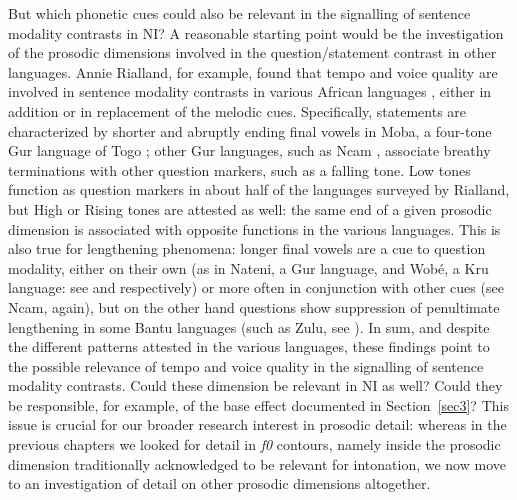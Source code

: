 But which phonetic cues could also be relevant in the signalling of sentence modality contrasts in NI? A reasonable starting point would be the investigation of the prosodic dimensions involved in the question/statement contrast in other languages. Annie Rialland, for example, found that tempo and voice quality are involved in sentence modality contrasts in various African languages \citep{rialland2007question}, either in addition or in replacement of the melodic cues. Specifically, statements are characterized by shorter and abruptly ending final vowels in Moba, a four-tone Gur language of Togo \citep{rialland1984fini}; other Gur languages, such as Ncam \citep{podi1995esquisse}, associate breathy terminations with other question markers, such as a falling tone. Low tones function as question markers in about half of the languages surveyed by Rialland, but High or Rising tones are attested as well: the same end of a given prosodic dimension is associated with opposite functions in the various languages. This is also true for lengthening phenomena: longer final vowels are a cue to question modality, either on their own (as in Nateni, a Gur language, and Wobé, a Kru language: see \citealt{neukom1995description} and \citealt{marchese1978atlas} respectively) or more often in conjunction with other cues (see Ncam, again), but on the other hand questions show suppression of penultimate lengthening in some Bantu languages (such as Zulu, see \citealt{taljaard1988handbook}). In sum, and despite the different patterns attested in the various languages, these findings point to the possible relevance of tempo and voice quality in the signalling of sentence modality contrasts. Could these dimension be relevant in NI as well? Could they be responsible, for example, of the base effect documented in Section~\ref{sec3}? This issue is crucial for our broader research interest in prosodic detail: whereas in the previous chapters we looked for detail in \textit{f0} contours, namely inside the prosodic dimension traditionally acknowledged to be relevant for intonation, we now move to an investigation of detail on other prosodic dimensions altogether.

